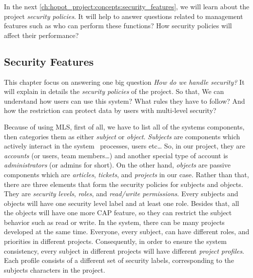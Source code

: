 In the next \autoref{ch:hopot_project:concepts:security_features}, we will learn about the project \emph{security policies}.
It will help to answer questions related to management features such as who can perform these functions? How security policies will affect their performance?


\subsection{Security Features}
\label{ch:hopot_project:concepts:security_features}

This chapter focus on answering one big question \emph{How do we handle security?}
It will explain in details the \emph{security policies} of the project.
So that, We can understand how users can use this system? What rules they have to follow? And how the restriction can protect data by users with multi-level security?

Because of using MLS, first of all, we have to list all of the systems components, then categories them as either \emph{subject} or \emph{object}.
\emph{Subjects} are components which actively interact in the system \eg\ processes, users etc\dots
So, in our project, they are \emph{accounts} (or users, team members\dots) and another special type of account is \emph{administrators} (or admins for short).
On the other hand, \emph{objects} are passive components which are \emph{articles}, \emph{tickets}, and \emph{projects} in our case.
Rather than that, there are three elements that form the security policies for subjects and objects. They are \emph{security levels}, \emph{roles}, and \emph{read/write permissions}.
Every subjects and objects will have one security level label and at least one role. 
Besides that, all the objects will have one more CAP feature, so they can restrict the subject behavior such as read or write.
In the system, there can be many projects developed at the same time.
Everyone, every subject, can have different roles, and priorities in different projects.
Consequently, in order to ensure the system consistency, every subject in different projects will have different \emph{project profiles}.
Each profile consists of a different set of security labels, corresponding to the subjects characters in the project. %


